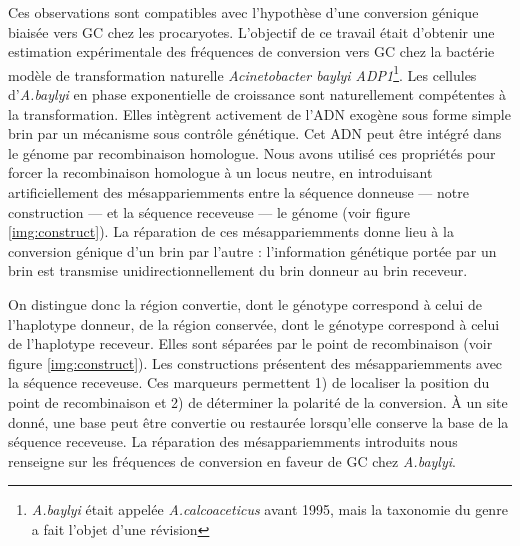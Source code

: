Ces observations sont compatibles avec l'hypothèse d'une conversion génique
biaisée vers GC chez les procaryotes. L'objectif de ce travail était d'obtenir
une estimation expérimentale des fréquences de conversion vers GC chez la
bactérie modèle de transformation naturelle \emph{Acinetobacter baylyi
  ADP1}\footnote{\emph{A.baylyi} était appelée \emph{A.calcoaceticus} avant
  1995, mais la taxonomie du genre a fait l'objet d'une
  révision\cite{euzeby_list_1997}}. Les cellules d'\emph{A.baylyi} en phase
exponentielle de croissance sont naturellement compétentes à la transformation.
Elles intègrent activement de l'ADN exogène sous forme simple brin par un
mécanisme sous contrôle génétique. Cet ADN peut être intégré dans le génome par
recombinaison homologue. Nous avons utilisé ces propriétés pour forcer la
recombinaison homologue à un locus neutre, en introduisant artificiellement des
mésappariemments entre la séquence donneuse --- notre construction --- et la
séquence receveuse --- le génome (voir figure \ref{img:construct}). La
réparation de ces mésappariemments donne lieu à la conversion génique d'un brin
par l'autre : l'information génétique portée par un brin est transmise
unidirectionnellement du brin donneur au brin receveur.

On distingue donc la région convertie, dont le génotype correspond à celui de
l'haplotype donneur, de la région conservée, dont le génotype correspond à celui
de l'haplotype receveur. Elles sont séparées par le point de recombinaison (voir
figure \ref{img:construct}). Les constructions présentent des mésappariemments
avec la séquence receveuse. Ces marqueurs permettent 1) de localiser la position
du point de recombinaison et 2) de déterminer la polarité de la conversion. À un
site donné, une base peut être convertie ou restaurée lorsqu'elle conserve la
base de la séquence receveuse. La réparation des mésappariemments introduits nous renseigne sur les
fréquences de conversion en faveur de GC chez \emph{A.baylyi}.


